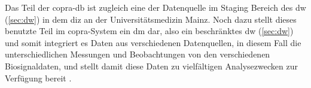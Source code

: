 Das Teil der \ac{copra}-\ac{db} ist zugleich eine der Datenquelle im Staging Bereich des \ac{dw} (\ref{sec:dw}) in dem \ac{diz} an der Universitätsmedizin Mainz. Noch dazu stellt dieses benutzte Teil im \ac{copra}-System ein \ac{dm} dar, also ein beschränktes \acf{dw} (\ref{sec:dw}) und somit integriert es Daten aus verschiedenen Datenquellen, in diesem Fall die unterschiedlichen  Messungen und Beobachtungen von den verschiedenen Biosignaldaten, und stellt damit diese Daten zu vielfältigen Analysezwecken zur Verfügung bereit \cite{planungdatawarehouse, dwbauer}. %